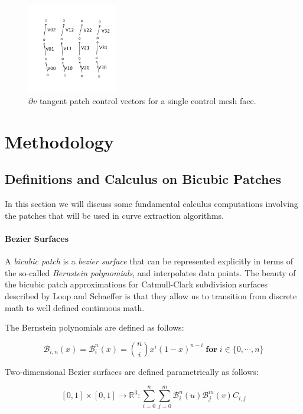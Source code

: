 \documentclass[12pt, letterpaper]{article}
\begin{document}
		\begin{figure}[h]
		\centering
		\includegraphics[width=0.35\textwidth]{dvPatch}
		\caption{$\partial v$ tangent patch control vectors for a single control mesh face.}
		\label{fig:dV}
		\end{figure}



\section{Methodology}

	\subsection{Definitions and Calculus on Bicubic Patches}
	
	In this section we will discuss some fundamental calculus computations involving the patches that will be used in curve extraction algorithms.

		\paragraph{Bezier Surfaces}
		A \emph{bicubic patch} is a \emph{bezier surface} that can be represented explicitly in terms of the so-called
		\emph{Bernstein polynomials}, and interpolates data points.
		The beauty of the bicubic patch approximations for Catmull-Clark subdivision surfaces described by Loop and Schaeffer
		is that they allow us to transition from discrete math to well defined continuous math.

		The Bernstein polynomials are defined as follows:

		$$\mathcal{B}_{i, n}(x) = \mathcal{B}_{i}^{n}(x) = \binom{n}{i}x^{i}(1-x)^{n-i} \; \textbf{for} \; i \in \{0, \cdots, n\}  $$
		
		Two-dimensional Bezier surfaces are defined parametrically as follows: 
		
		$$[0, 1] \times [0, 1] \rightarrow \mathbb{R}^{3} : \sum_{i=0}^{n}{\sum_{j=0}^{m}{\mathcal{B}_{i}^{n}(u) \mathcal{B}_{j}^{m}(v) C_{i, j}}}$$
		
\end{document}
